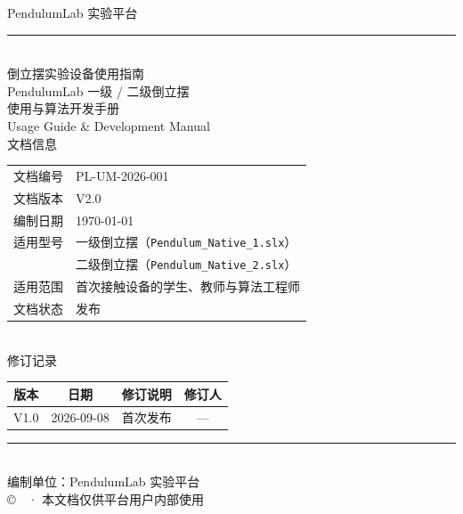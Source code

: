 \documentclass[12pt,a4paper]{article}
\begin{document}
\begin{titlepage}
    \centering
    \vspace*{1.5cm}
    {\color{gray}\heiti PendulumLab 实验平台}\\[0.8em]
    {\color{gray!60}\rule{0.72\textwidth}{0.4pt}}\\[2.2em]

    {\fontsize{28pt}{40pt}\selectfont\heiti 倒立摆实验设备使用指南}\\[1em]
    {\Large\heiti PendulumLab 一级 / 二级倒立摆}\\[0.5em]
    {\Large 使用与算法开发手册}\\[0.7em]
    {\normalsize\color{gray} Usage Guide \& Development Manual}\\[2.6em]

    {\heiti 文档信息}\\[0.6em]
    \begin{tabular}{@{}>{\heiti\small}p{3.2cm} p{9.6cm}@{}}
        \toprule
        文档编号 & PL-UM-2026-001 \\
        文档版本 & V2.0 \\
        编制日期 & \today \\
        适用型号 & 一级倒立摆（\texttt{Pendulum\_Native\_1.slx}）\\
                 & 二级倒立摆（\texttt{Pendulum\_Native\_2.slx}）\\
        适用范围 & 首次接触设备的学生、教师与算法工程师 \\
        文档状态 & 发布 \\
        \bottomrule
    \end{tabular}\\[2.4em]

    {\heiti 修订记录}\\[0.6em]
    \begin{tabular}{@{}cccc@{}}
        \toprule
        \textbf{版本} & \textbf{日期} & \textbf{修订说明} & \textbf{修订人} \\
        \midrule
        V1.0 & 2026-09-08 & 首次发布 & --- \\
        \bottomrule
    \end{tabular}

    \vfill
    {\color{gray!60}\rule{0.72\textwidth}{0.4pt}}\\[1.2em]
    {\small\color{gray} 编制单位：PendulumLab 实验平台}\\[0.4em]
    {\small\color{gray} \copyright\ \the\year\ · 本文档仅供平台用户内部使用}
\end{titlepage}
\end{document}
